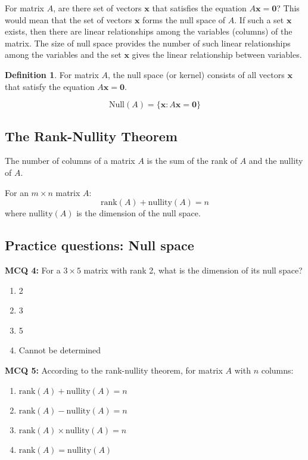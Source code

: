 \documentclass[11pt,a4paper]{article}
\theoremstyle{definition}
\newtheorem{definition}{Definition}[section]
\begin{document}
For matrix $A$, are there set of vectors $\mathbf{x}$ that satisfies the equation $A\mathbf{x} = \mathbf{0}$? 
This would mean that the set of vectors $\mathbf{x}$ forms the null space of $A$. If such a set $\mathbf{x}$ exists, then there are linear relationships among the variables (columns) of the matrix. 
The size of null space provides the number of such linear relationships among the variables and the set $\mathbf{x}$ gives the linear relationship between variables.

\begin{defbox}
\begin{definition}
For matrix $A$, the null space (or kernel) consists of all vectors $\mathbf{x}$ that satisfy the equation $A\mathbf{x} = \mathbf{0}$.

\[\text{Null}(A) = \{\mathbf{x} : A\mathbf{x} = \mathbf{0}\}\]
\end{definition}
\end{defbox}

\subsection{The Rank-Nullity Theorem}

The number of columns of a matrix $A$ is the sum of the rank of $A$ and the nullity of $A$.

For an $m \times n$ matrix $A$:
\[\text{rank}(A) + \text{nullity}(A) = n\]
where $\text{nullity}(A)$ is the dimension of the null space.


\subsection{Practice questions: Null space}

\textbf{MCQ 4:} For a $3 \times 5$ matrix with rank 2, what is the dimension of its null space?

\begin{enumerate}
    \item 2
    \item 3
    \item 5
    \item Cannot be determined
\end{enumerate}

\noindent \textbf{MCQ 5:} According to the rank-nullity theorem, for matrix $A$ with $n$ columns:

\begin{enumerate}
    \item $\text{rank}(A) + \text{nullity}(A) = n$
    \item $\text{rank}(A) - \text{nullity}(A) = n$
    \item $\text{rank}(A) \times \text{nullity}(A) = n$
    \item $\text{rank}(A) = \text{nullity}(A)$
\end{enumerate}
\end{document}
